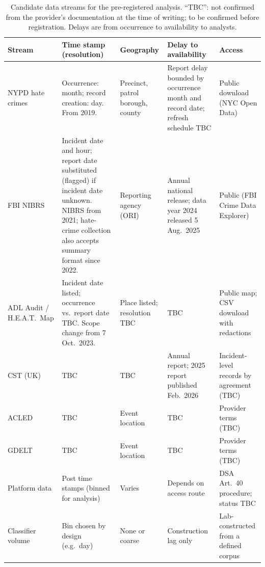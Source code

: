 \begin{table}[!htbp]
\centering
\caption{Candidate data streams for the pre-registered analysis. ``TBC'':
not confirmed from the provider's documentation at the time of writing; to
be confirmed before registration. Delays are from occurrence to
availability to analysts.}
\label{tab:data-streams}
\footnotesize
\setlength{\tabcolsep}{3pt}
\renewcommand{\arraystretch}{1.15}
\begin{tabularx}{\textwidth}{@{}>{\raggedright\arraybackslash}p{2.35cm}
  >{\raggedright\arraybackslash}X
  >{\raggedright\arraybackslash}p{2.2cm}
  >{\raggedright\arraybackslash}X
  >{\raggedright\arraybackslash}p{2.6cm}@{}}
\toprule
Stream & Time stamp (resolution) & Geography & Delay to availability & Access \\
\midrule
NYPD hate crimes \citep{nypdhate}
  & Occurrence: month; record creation: day. From 2019.
  & Precinct, patrol borough, county
  & Report delay bounded by occurrence month and record date; refresh schedule TBC
  & Public download (NYC Open Data) \\
FBI NIBRS \citep{fbi2025nibrs,fbi2026nibrs,crs2025hate}
  & Incident date and hour; report date substituted (flagged) if incident date unknown. NIBRS from 2021; hate-crime collection also accepts summary format since 2022.
  & Reporting agency (ORI)
  & Annual national release; data year 2024 released 5 Aug.\ 2025
  & Public (FBI Crime Data Explorer) \\
ADL Audit / H.E.A.T.\ Map \citep{adl2025audit,adlheatmap}
  & Incident date listed; occurrence vs.\ report date TBC. Scope change from 7 Oct.\ 2023.
  & Place listed; resolution TBC
  & TBC
  & Public map; CSV download with redactions \\
CST (UK) \citep{cst2026incidents}
  & TBC
  & TBC
  & Annual report; 2025 report published Feb.\ 2026
  & Incident-level records by agreement (TBC) \\
ACLED \citep{raleigh2010}
  & TBC
  & Event location
  & TBC
  & Provider terms (TBC) \\
GDELT \citep{leetaru2013}
  & TBC
  & Event location
  & TBC
  & Provider terms (TBC) \\
Platform data \citep{eu2022dsa}
  & Post time stamps (binned for analysis)
  & Varies
  & Depends on access route
  & DSA Art.~40 procedure; status TBC \\
Classifier volume \citep{kornsteinlab2026detection,kornsteinlab2026measurement}
  & Bin chosen by design (e.g.\ day)
  & None or coarse
  & Construction lag only
  & Lab-constructed from a defined corpus \\
\bottomrule
\end{tabularx}
\end{table}

